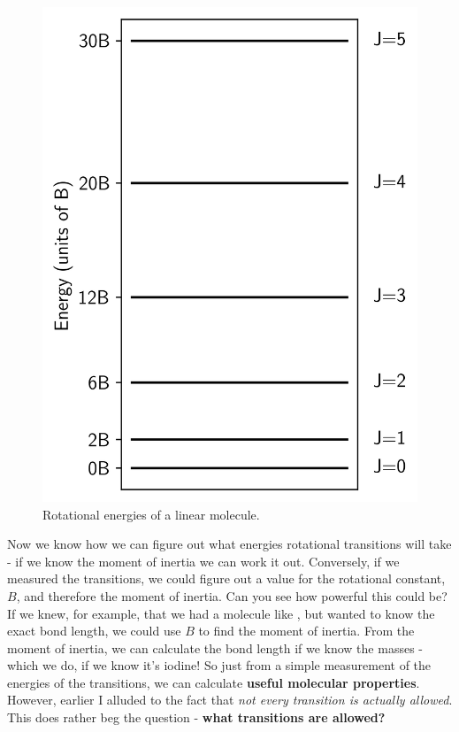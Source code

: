 \documentclass{memoir}[11pt,oneside,a4paper,openany]
\begin{document}
\begin{figure}
	\centering
	\includegraphics[width=\linewidth]{rotational_energy_levels}
	\caption{Rotational energies of a linear molecule.}
\end{figure}
Now we know how we can figure out what energies rotational transitions will take - if we know the moment of inertia we can work it out. Conversely, if we measured the transitions, we could figure out a value for the rotational constant, $B$, and therefore the moment of inertia. Can you see how powerful this could be? If we knew, for example, that we had a molecule like , but wanted to know the exact bond length, we could use $B$ to find the moment of inertia. From the moment of inertia, we can calculate the bond length if we know the masses - which we do, if we know it's iodine! So just from a simple measurement of the energies of the transitions, we can calculate \textbf{useful molecular properties}. However, earlier I alluded to the fact that \emph{not every transition is actually allowed}. This does rather beg the question - \textbf{what transitions are allowed?}
\end{document}
